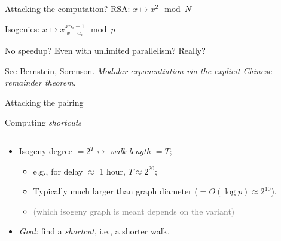 \documentclass[aspectratio=169]{beamer}
\begin{document}

\begin{frame}{Attacking the computation?}
  \large\centering
  RSA: \hfill $x \longmapsto x^2\mod N$ \hspace{4em}

  \vfill
  Isogenies: \hfill $\displaystyle x \longmapsto x\frac{x\alpha_i-1}{x-\alpha_i}\mod p$ \hspace{4em}

  \vfill
  No speedup? Even with unlimited parallelism? Really?
  
  \medskip
  See Bernstein, Sorenson. \emph{Modular exponentiation via the
    explicit Chinese remainder theorem}.
\end{frame}


\begin{frame}{Attacking the pairing}
  
\end{frame}


\begin{frame}{Computing \textit{shortcuts}}
  \begin{columns}
    \begin{column}{0.5\textwidth}
      \begin{itemize}
      \item Isogeny degree $= 2^T \leftrightarrow$ \emph{walk length $= T$};
        \begin{itemize}
        \item e.g., for delay $\approx$ 1 hour, \emph{$T\approx 2^{20}$};
        \item<2-> Typically much larger than graph diameter (\emph{$= O(\log p) \approx 2^{10}$}).
        \item<2-> \textcolor{gray}{(which isogeny graph is meant depends on the variant)}
        \end{itemize}
      \item<3-> \emph{Goal:} find a \emph{\textit{shortcut}}, i.e., a
        shorter walk.
      \end{itemize}
    \end{column}
    \begin{column}{0.5\textwidth}
      \centering
    \end{column}
  \end{columns}
\end{frame}
\end{document}
